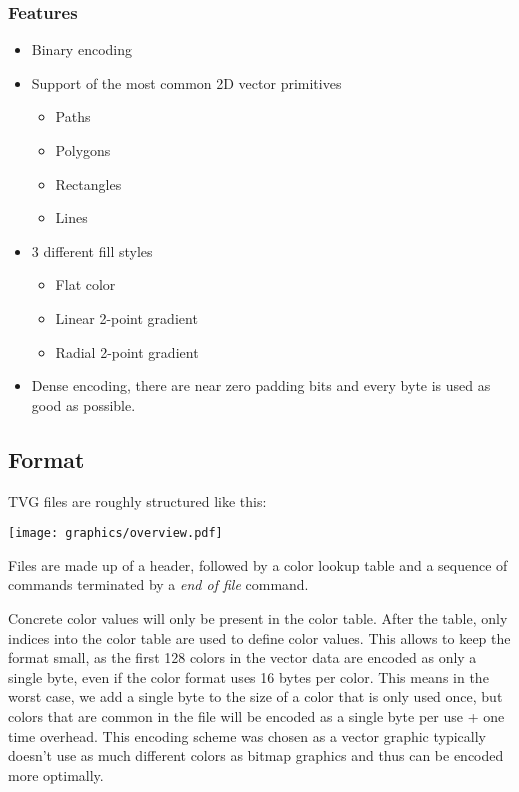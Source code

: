 \documentclass[]{article}
\providecommand{\tightlist}{%
  \setlength{\itemsep}{0pt}\setlength{\parskip}{0pt}}
\begin{document}
\hypertarget{features}{%
\subsubsection{Features}\label{features}}

\begin{itemize}
\tightlist
\item
  Binary encoding
\item
  Support of the most common 2D vector primitives

  \begin{itemize}
  \tightlist
  \item
    Paths
  \item
    Polygons
  \item
    Rectangles
  \item
    Lines
  \end{itemize}
\item
  3 different fill styles

  \begin{itemize}
  \tightlist
  \item
    Flat color
  \item
    Linear 2-point gradient
  \item
    Radial 2-point gradient
  \end{itemize}
\item
  Dense encoding, there are near zero padding bits and every byte is
  used as good as possible.
\end{itemize}

\hypertarget{format}{%
\subsection{Format}\label{format}}

TVG files are roughly structured like this:

\texttt{[image: graphics/overview.pdf]}

Files are made up of a header, followed by a color lookup table and a
sequence of commands terminated by a \emph{end of file} command.

Concrete color values will only be present in the color table. After the
table, only indices into the color table are used to define color
values. This allows to keep the format small, as the first 128 colors in
the vector data are encoded as only a single byte, even if the color
format uses 16 bytes per color. This means in the worst case, we add a
single byte to the size of a color that is only used once, but colors
that are common in the file will be encoded as a single byte per use +
one time overhead. This encoding scheme was chosen as a vector graphic
typically doesn't use as much different colors as bitmap graphics and
thus can be encoded more optimally.
\end{document}
